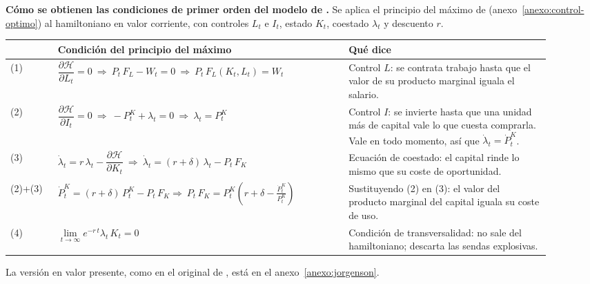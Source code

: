 \documentclass[11pt]{article}
\begin{document}
\begin{anotaciones}[unbreakable]
\textbf{Cómo se obtienen las condiciones de primer orden del modelo de .} Se aplica el principio del máximo de  (anexo~\ref{anexo:control-optimo}) al hamiltoniano en valor corriente, con controles $L_t$ e $I_t$, estado $K_t$, coestado $\lambda_t$ y descuento $r$.

\medskip
{\centering\renewcommand{\arraystretch}{1.5}%
\begin{tabular}{@{}>{\centering\arraybackslash}m{0.08\linewidth}>{\raggedright\arraybackslash}m{0.49\linewidth}>{\raggedright\arraybackslash}m{0.34\linewidth}@{}}
\toprule
 & \textbf{Condición del principio del máximo} & \textbf{Qué dice}\\
\midrule
(1) & $\dfrac{\partial\mathcal{H}}{\partial L_t}=0\ \Rightarrow\ P_t\,F_L-W_t=0\ \Rightarrow\ \boxed{P_t\,F_L(K_t,L_t)=W_t}$ & Control $L$: se contrata trabajo hasta que el valor de su producto marginal iguala el salario.\\
(2) & $\dfrac{\partial\mathcal{H}}{\partial I_t}=0\ \Rightarrow\ -P^K_t+\lambda_t=0\ \Rightarrow\ \lambda_t=P^K_t$ & Control $I$: se invierte hasta que una unidad más de capital vale lo que cuesta comprarla. Vale en todo momento, así que $\dot\lambda_t=\dot P^K_t$.\\
(3) & $\dot\lambda_t=r\,\lambda_t-\dfrac{\partial\mathcal{H}}{\partial K_t}\ \Rightarrow\ \dot\lambda_t=(r+\delta)\,\lambda_t-P_t\,F_K$ & Ecuación de coestado: el capital rinde lo mismo que su coste de oportunidad.\\
(2)+(3) & $\dot P^K_t=(r+\delta)\,P^K_t-P_t\,F_K$\newline$\Rightarrow\ \boxed{P_t\,F_K=P^K_t\left(r+\delta-\tfrac{\dot P^K_t}{P^K_t}\right)}$ & Sustituyendo (2) en (3): el valor del producto marginal del capital iguala su coste de uso.\\
(4) & $\boxed{\lim\limits_{t\to\infty}e^{-r\,t}\lambda_t\,K_t=0}$ & Condición de transversalidad: no sale del hamiltoniano; descarta las sendas explosivas.\\
\bottomrule
\end{tabular}\par}
\medskip
La versión en valor presente, como en el original de , está en el anexo~\ref{anexo:jorgenson}.
\end{anotaciones}
\end{document}
